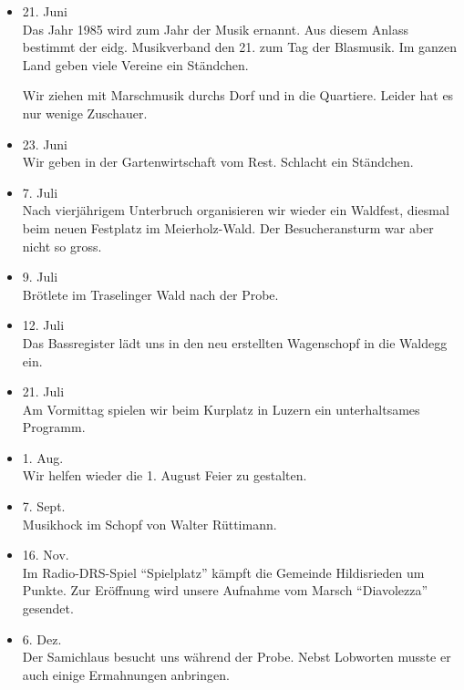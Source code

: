 \begin{multicols}{2}
\begin{itemize}
        \item[]21. Juni\\
        Das Jahr 1985 wird zum Jahr der Musik ernannt. Aus diesem Anlass
        bestimmt der eidg. Musikverband den 21. zum Tag der Blasmusik. Im ganzen
        Land geben viele Vereine ein Ständchen.

        Wir ziehen mit Marschmusik durchs Dorf und in die Quartiere. Leider hat
        es nur wenige Zuschauer.

        \item[]23. Juni\\
        Wir geben in der Gartenwirtschaft vom Rest. Schlacht ein Ständchen.

        \item[]7. Juli\\
        Nach vierjährigem Unterbruch organisieren wir wieder ein Waldfest,
        diesmal beim neuen Festplatz im Meierholz-Wald. Der Besucheransturm war
        aber nicht so gross.

        \item[]9. Juli\\
        Brötlete im Traselinger Wald nach der Probe.

        \item[]12. Juli\\
        Das Bassregister lädt uns in den neu erstellten Wagenschopf in die
        Waldegg ein.

        \item[]21. Juli\\
        Am Vormittag spielen wir beim Kurplatz in Luzern ein unterhaltsames
        Programm.

        \item[]1. Aug.\\
        Wir helfen wieder die 1. August Feier zu gestalten.

        \item[]7. Sept.\\
        Musikhock im Schopf von Walter Rüttimann.

        \item[]16. Nov.\\
        Im Radio-DRS-Spiel \enquote{Spielplatz} kämpft die Gemeinde Hildisrieden
        um Punkte. Zur Eröffnung wird unsere Aufnahme vom Marsch
        \enquote{Diavolezza} gesendet.

        \item[]6. Dez.\\
        Der Samichlaus besucht uns während der Probe. Nebst Lobworten musste er
        auch einige Ermahnungen anbringen.

    \end{itemize}

\end{multicols}
